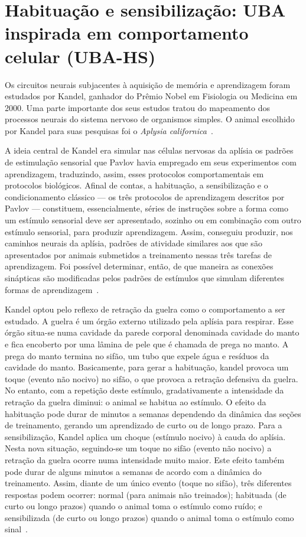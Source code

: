 \chapter{Habituação e sensibilização: UBA inspirada em comportamento celular (UBA-HS)}

Os circuitos neurais subjacentes à aquisição de memória e aprendizagem foram estudados por Kandel, ganhador do Prêmio Nobel em Fisiologia ou Medicina em 2000. Uma parte importante dos seus estudos tratou do mapeamento dos processos neurais do sistema nervoso de organismos simples. O animal escolhido por Kandel para suas pesquisas foi o \textit{Aplysia californica}~\cite{kandel06}.

A ideia central de Kandel era simular nas células nervosas da aplísia os padrões de estimulação sensorial que Pavlov havia empregado em seus experimentos com aprendizagem, traduzindo, assim, esses protocolos comportamentais em protocolos biológicos. Afinal de contas, a habituação, a sensibilização e o condicionamento clássico --- os três protocolos de aprendizagem descritos por Pavlov --- constituem, essencialmente, séries de instruções sobre a forma como um estímulo sensorial deve ser apresentado, sozinho ou em combinação com outro estímulo sensorial, para produzir aprendizagem. Assim, conseguiu produzir, nos caminhos neurais da aplísia, padrões de atividade similares aos que são apresentados por animais submetidos a treinamento nessas três tarefas de aprendizagem. Foi possível determinar, então, de que maneira as conexões sinápticas são modificadas pelos padrões de estímulos que simulam diferentes formas de aprendizagem~\cite{kandel06}.

Kandel optou pelo reflexo de retração da guelra como o comportamento a ser estudado. A guelra é um órgão externo utilizado pela aplísia para respirar. Esse órgão situa-se numa cavidade da parede corporal denominada cavidade do manto e fica encoberto por uma lâmina de pele que é chamada de prega no manto. A prega do manto termina no sifão, um tubo que expele água e resíduos da cavidade do manto. Basicamente, para gerar a habituação, kandel provoca um toque (evento não nocivo) no sifão, o que provoca a retração defensiva da guelra. No entanto, com a repetição deste estímulo, gradativamente a intensidade da retração da guelra diminui: o animal se habitua ao estímulo. O efeito da habituação pode durar de minutos a semanas dependendo da dinâmica das seções de treinamento, gerando um aprendizado de curto ou de longo prazo. Para a sensibilização, Kandel aplica um choque (estímulo nocivo) à cauda do aplísia. Nesta nova situação, seguindo-se um toque no sifão (evento não nocivo) a retração da guelra ocorre numa intensidade muito maior. Este efeito também pode durar de alguns minutos a semanas de acordo com a dinâmica do treinamento. Assim, diante de um único evento (toque no sifão), três diferentes respostas podem ocorrer: normal (para animais não treinados); habituada (de curto ou longo prazos) quando o animal toma o estímulo como ruído; e sensibilizada (de curto ou longo prazos) quando o animal toma o estímulo como sinal~\cite{kandel06, kandel00, kandel06a, kandel06b, kandel01, kandel70}.

